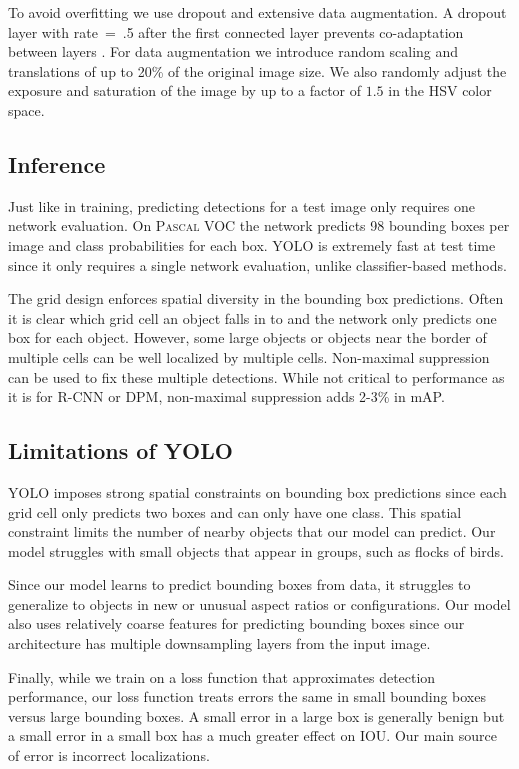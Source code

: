 \documentclass[10pt,twocolumn,letterpaper]{article}
\begin{document}
To avoid overfitting we use dropout and extensive data augmentation. A dropout layer with rate~=~.5 after the first connected layer prevents co-adaptation between layers \cite{hinton2012improving}. For data augmentation we introduce random scaling and translations of up to 20\% of the original image size. We also randomly adjust the exposure and saturation of the image by up to a factor of $1.5$ in the HSV color space.

\subsection{Inference}

Just like in training, predicting detections for a test image only requires one network evaluation. On \textsc{Pascal} VOC the network predicts 98 bounding boxes per image and class probabilities for each box. YOLO is extremely fast at test time since it only requires a single network evaluation, unlike classifier-based methods.

The grid design enforces spatial diversity in the bounding box predictions. Often it is clear which grid cell an object falls in to and the network only predicts one box for each object. However, some large objects or objects near the border of multiple cells can be well localized by multiple cells. Non-maximal suppression can be used to fix these multiple detections. While not critical to performance as it is for R-CNN or DPM, non-maximal suppression adds 2-3\% in mAP.

\subsection{Limitations of YOLO}

YOLO imposes strong spatial constraints on bounding box predictions since each grid cell only predicts two boxes and can only have one class. This spatial constraint limits the number of nearby objects that our model can predict. Our model struggles with small objects that appear in groups, such as flocks of birds.

Since our model learns to predict bounding boxes from data, it struggles to generalize to objects in new or unusual aspect ratios or configurations. Our model also uses relatively coarse features for predicting bounding boxes since our architecture has multiple downsampling layers from the input image.

Finally, while we train on a loss function that approximates detection performance, our loss function treats errors the same in small bounding boxes versus large bounding boxes. A small error in a large box is generally benign but a small error in a small box has a much greater effect on IOU. Our main source of error is incorrect localizations.
\end{document}
